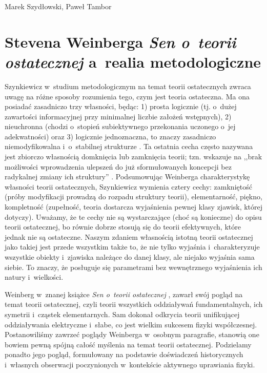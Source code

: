 \begin{artplenv2auth}{Marek Szydłowski, Paweł Tambor}
\section{Stevena Weinberga \textit{Sen o~teorii ostatecznej} a~realia metodologiczne}
Szynkiewicz w~studium metodologicznym na temat teorii ostatecznych zwraca uwagę na różne sposoby rozumienia tego, czym jest teoria ostateczna. Ma ona posiadać zasadniczo trzy własności, będąc: 1) prosta logicznie (tj. o~dużej zawartości informacyjnej przy minimalnej liczbie założeń wstępnych), 2) nieuchronna (chodzi o~stopień subiektywnego przekonania uczonego o~jej adekwatności) oraz 3) logicznie jednoznaczna, to znaczy zasadniczo niemodyfikowalna i~o~stabilnej strukturze 
\parencite[][s.~17]{szynkiewicz_teorie_2009}. %
 Ta ostatnia cecha często nazywana jest zbiorczo własnością domknięcia lub zamknięcia teorii; tzn. wskazuje na ,,brak możliwości wprowadzenia ulepszeń do już sformułowanych koncepcji bez radykalnej zmiany ich struktury'' 
\parencite[][s.~19]{szynkiewicz_teorie_2009}. %
 Podsumowując Weinberga charakterystykę własności teorii ostatecznych, Szynkiewicz wymienia cztery cechy: zamkniętość (próby modyfikacji prowadzą do rozpadu struktury teorii), elementarność, piękno, kompletność (zupełność, teoria dostarcza wyjaśnienia pewnej klasy zjawisk, której dotyczy). Uważamy, że te cechy nie są wystarczające (choć są konieczne) do opisu teorii ostatecznej, bo równie dobrze stosują się do teorii efektywnych, które jednak nie są ostateczne. Naszym zdaniem własnością istotną teorii ostatecznej jako takiej jest przede wszystkim także to, że nie tylko wyjaśnia i~charakteryzuje wszystkie obiekty i~zjawiska należące do danej klasy, ale niejako wyjaśnia sama siebie. To znaczy, że posługuje się parametrami bez wewnętrznego wyjaśnienia ich natury i~wielkości.

Weinberg w~znanej książce \textit{Sen o~teorii ostatecznej}
\parencite*[][]{weinberg_sen_1992}, %
 zawarł swój pogląd na temat teorii ostatecznej, czyli teorii wszystkich oddziaływań fundamentalnych, ich symetrii i~cząstek elementarnych. Sam dokonał odkrycia teorii unifikującej oddziaływania elektryczne i~słabe, co jest wielkim sukcesem fizyki współczesnej. Postanowiliśmy zawrzeć poglądy Weinberga w~osobnym paragrafie, stanowią one bowiem pewną spójną całość myślenia na temat teorii ostatecznej. Podzielamy ponadto jego pogląd, formułowany na podstawie doświadczeń historycznych i~własnych obserwacji poczynionych w~kontekście aktywnego uprawiania fizyki.


\end{artplenv2auth}
